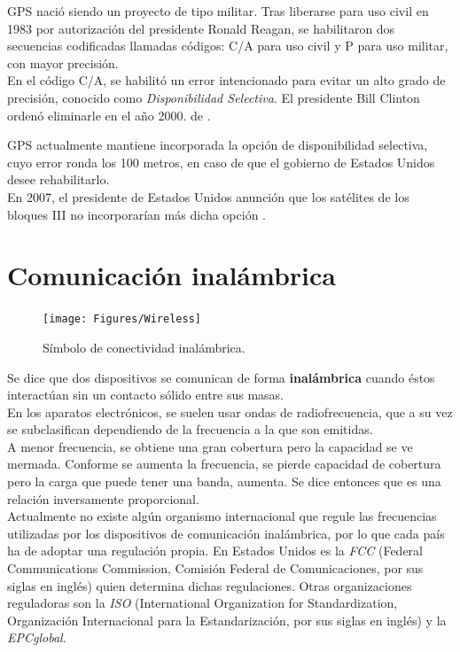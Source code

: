 GPS nació siendo un proyecto de tipo militar. Tras liberarse para uso civil en 1983 por autorización del presidente Ronald Reagan, se habilitaron dos secuencias codificadas llamadas códigos: C/A para uso civil y P para uso militar, con mayor precisión. \\

En el código C/A, se habilitó un error intencionado para evitar un alto grado de precisión, conocido como \textit{Disponibilidad Selectiva}. El presidente Bill Clinton ordenó eliminarle en el año 2000. de \cite{termal2014prototipo}.

GPS actualmente mantiene incorporada la opción de disponibilidad selectiva, cuyo error ronda los 100 metros, en caso de que el gobierno de Estados Unidos desee rehabilitarlo. \\

En 2007, el presidente de Estados Unidos anunción que los satélites de los bloques III no incorporarían más dicha opción \cite{chafer2017diseno}.

\section{Comunicación inalámbrica}

\begin{figure}[ht]
\centering
\texttt{[image: Figures/Wireless]}
\caption[Símbolo de conectividad inalámbrica.]{Símbolo de conectividad inalámbrica.}
\label{fig:ErrWrl}
\end{figure}

Se dice que dos dispositivos se comunican de forma \textbf{inalámbrica} cuando éstos interactúan sin un contacto sólido entre sus masas. \\

En los aparatos electrónicos, se suelen usar ondas de radiofrecuencia, que a su vez se subclasifican dependiendo de la frecuencia a la que son emitidas.\\

A menor frecuencia, se obtiene una gran cobertura pero la capacidad se ve mermada. Conforme se aumenta la frecuencia, se pierde capacidad de cobertura pero la carga que puede tener una banda, aumenta. Se dice entonces que es una relación inversamente proporcional.\\

Actualmente no existe algún organismo internacional que regule las frecuencias utilizadas por los dispositivos de comunicación inalámbrica, por lo que cada país ha de adoptar una regulación propia. En Estados Unidos es la \textit{FCC} (Federal Communications Commission, Comisión Federal de Comunicaciones, por sus siglas en inglés) quien determina dichas regulaciones. Otras organizaciones reguladoras son la \textit{ISO} (International Organization for Standardization, Organización Internacional para la Estandarización, por sus siglas en inglés) y la \textit{EPCglobal}.

